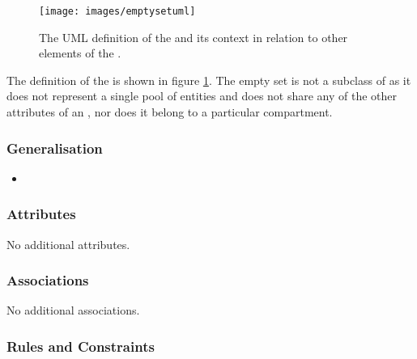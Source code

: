 \begin{figure}[htb]
  \centering
  \texttt{[image: images/emptysetuml]}
  \caption{The UML definition of the  and its context
    in relation to other elements of the \PDl.}
  \label{fig:techref:emptysetuml}
\end{figure}

The definition of the  is shown in figure
\ref{fig:techref:emptysetuml}. The empty set is not a subclass of  as it does not
represent a single pool of entities and does not share any of the
other attributes of an , nor does it belong to a particular
compartment.

\subsubsection{Generalisation}

\begin{itemize}
\item {}
\end{itemize}

\subsubsection{Attributes}

No additional attributes.

\subsubsection{Associations}

No additional associations.

\subsubsection{Rules and Constraints}

\begin{valrules}
\end{valrules}


